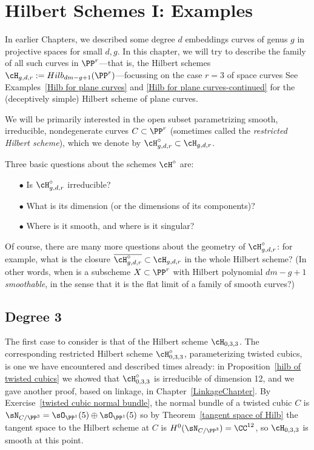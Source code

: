 

\chapter{Hilbert Schemes I: Examples}
\label{HilbertSchemesChapter}

In earlier Chapters, we described some  degree $d$ embeddings curves of  genus $g$ in projective spaces for small $d,g$. In this chapter, we will try to describe the family of all such curves in $\PP^r$---that is, the Hilbert schemes 
$\cH_{g,d,r} := Hilb_{dm-g+1}(\PP^r)$---focussing  on the case $r=3$ of space curves
See Examples~\ref{Hilb for plane curves} and \ref{Hilb for plane curves-continued} for the (deceptively simple) Hilbert scheme of plane curves. 

We will be primarily interested in 
the open subset parametrizing smooth, irreducible, nondegenerate curves $C \subset \PP^r$ (sometimes called the \emph{restricted Hilbert scheme}), which we denote by $\cH^\circ_{g,d,r}\subset \cH_{g,d,r}$. 


Three basic questions about the schemes $\cH^\circ$ are:

\begin{enumerate}
\item[$\bullet$] Is $\cH^\circ_{g,d,r}$ irreducible? 
\item[$\bullet$]  What is its dimension (or the dimensions of its components)?
\item[$\bullet$] Where is it smooth, and where is it singular?
\end{enumerate}

Of course, there are many more questions about the geometry of $\cH^\circ_{g,d,r}$: for example,  what is the closure $\overline{\cH^\circ_{g,d,r}} \subset \cH_{g,d,r}$ in the whole Hilbert scheme? (In other words, when is a subscheme $X \subset \PP^r$ with Hilbert polynomial $dm-g+1$ \emph{smoothable}, in the sense that it is the flat limit of a family of smooth curves?) 


\section{Degree 3}

The first case to consider is that of the Hilbert scheme  $\cH_{0,3,3}$. The corresponding restricted Hilbert scheme $\cH^\circ_{0,3,3}$, parameterizing twisted cubics, is one we have encountered and described times already: in Proposition~\ref{hilb of twisted cubics} we showed that $\cH^\circ_{0,3,3}$ is irreducible of dimension 12,
and we gave another proof, based on linkage, in Chapter~\ref{LinkageChapter}. 
By Exercise~\ref{twisted cubic normal bundle}, the normal bundle of a twisted cubic $C$ is $\sN_{C/\PP^3}=\sO_{\PP^1}(5)\oplus \sO_{\PP^1}(5)$
so by Theorem~\ref{tangent space of Hilb} the tangent space to the Hilbert scheme at $C$ is
$H^0(\sN_{C/\PP^3}) = \CC^{12}$, so $\cH_{0,3,3}$ is smooth at this point.

